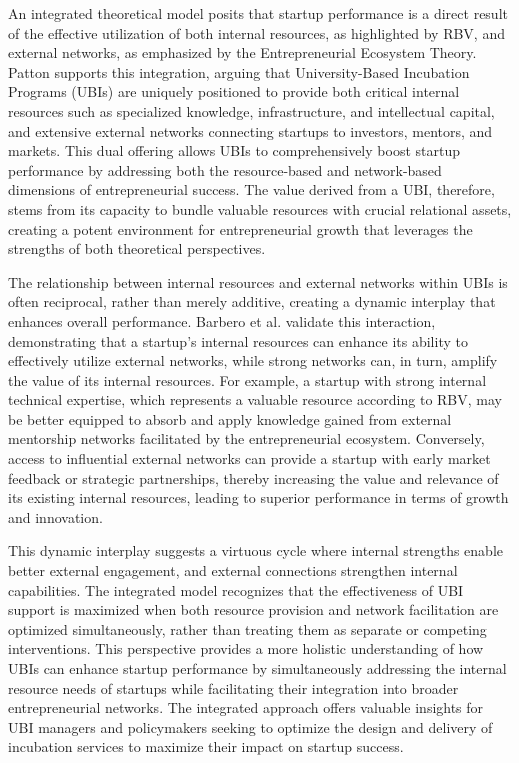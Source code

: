 \documentclass[../Main.tex]{subfiles}
\begin{document}
An integrated theoretical model posits that startup performance is a direct result of the effective utilization of both internal resources, as highlighted by RBV, and external networks, as emphasized by the Entrepreneurial Ecosystem Theory. Patton \autocite{patton2014realising} supports this integration, arguing that University-Based Incubation Programs (UBIs) are uniquely positioned to provide both critical internal resources such as specialized knowledge, infrastructure, and intellectual capital, and extensive external networks connecting startups to investors, mentors, and markets. This dual offering allows UBIs to comprehensively boost startup performance by addressing both the resource-based and network-based dimensions of entrepreneurial success. The value derived from a UBI, therefore, stems from its capacity to bundle valuable resources with crucial relational assets, creating a potent environment for entrepreneurial growth that leverages the strengths of both theoretical perspectives.

The relationship between internal resources and external networks within UBIs is often reciprocal, rather than merely additive, creating a dynamic interplay that enhances overall performance. Barbero et al. \autocite{barbero2012revisiting} validate this interaction, demonstrating that a startup's internal resources can enhance its ability to effectively utilize external networks, while strong networks can, in turn, amplify the value of its internal resources. For example, a startup with strong internal technical expertise, which represents a valuable resource according to RBV, may be better equipped to absorb and apply knowledge gained from external mentorship networks facilitated by the entrepreneurial ecosystem. Conversely, access to influential external networks can provide a startup with early market feedback or strategic partnerships, thereby increasing the value and relevance of its existing internal resources, leading to superior performance in terms of growth and innovation.

This dynamic interplay suggests a virtuous cycle where internal strengths enable better external engagement, and external connections strengthen internal capabilities. The integrated model recognizes that the effectiveness of UBI support is maximized when both resource provision and network facilitation are optimized simultaneously, rather than treating them as separate or competing interventions. This perspective provides a more holistic understanding of how UBIs can enhance startup performance by simultaneously addressing the internal resource needs of startups while facilitating their integration into broader entrepreneurial networks. The integrated approach offers valuable insights for UBI managers and policymakers seeking to optimize the design and delivery of incubation services to maximize their impact on startup success.
\end{document}
